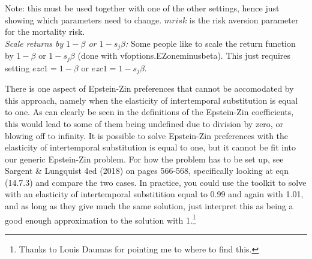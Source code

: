 Note: this must be used together with one of the other settings, hence just showing which parameters need to change. $mrisk$ is the risk aversion parameter for the mortality risk.
\\ \noindent \textit{Scale returns by $1-\beta$ or $1-s_j\beta$:}
Some people like to scale the return function by $1-\beta$ or $1-s_j\beta$ (done with vfoptions.EZoneminusbeta). This just requires setting $ezc1=1-\beta$ or $ezc1=1-s_j\beta$.

There is one aspect of Epstein-Zin preferences that cannot be accomodated by this approach, namely when the elasticity of intertemporal substitution is equal to one. As can clearly be seen in the definitions of the Epstein-Zin coefficients, this would lead to some of them being undefined due to division by zero, or blowing off to infinity. It is possible to solve Epstein-Zin preferences with the elasticity of intertemporal substitution is equal to one, but it cannot be fit into our generic Epstein-Zin problem. For how the problem has to be set up, see Sargent \& Lungquist 4ed (2018) on pages 566-568, specifically looking at eqn (14.7.3) and compare the two cases. In practice, you could use the toolkit to solve with an elasticity of intertemporal substitition equal to 0.99 and again with 1.01, and as long as they give much the same solution, just interpret this as being a good enough approximation to the solution with 1.\footnote{Thanks to Louis Daumas for pointing me to where to find this.}

